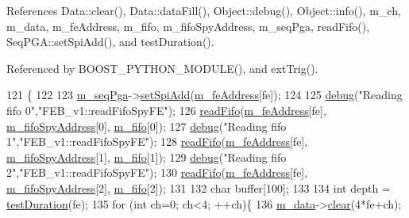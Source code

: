 References Data\+::clear(), Data\+::data\+Fill(), Object\+::debug(), Object\+::info(), m\+\_\+ch, m\+\_\+data, m\+\_\+fe\+Address, m\+\_\+fifo, m\+\_\+fifo\+Spy\+Address, m\+\_\+seq\+Pga, read\+Fifo(), Seq\+P\+G\+A\+::set\+Spi\+Add(), and test\+Duration().



Referenced by B\+O\+O\+S\+T\+\_\+\+P\+Y\+T\+H\+O\+N\+\_\+\+M\+O\+D\+U\+L\+E(), and ext\+Trig().


\begin{DoxyCode}
121                                              \{
122    
123   \hyperlink{classFEB__v1_a6c7804ac86796f233a8393043adf2e77}{m\_seqPga}->\hyperlink{classSeqPGA_ac998ce3a6d9b5f2e88cc8393f8c1df53}{setSpiAdd}(\hyperlink{classFEB__v1_a4e1945c2d5b434125f375e9d0fc6d99f}{m\_feAddress}[fe]);
124 
125   \hyperlink{classObject_aac010553f022165573714b7014a15f0d}{debug}(\textcolor{stringliteral}{"Reading fifo 0"},\textcolor{stringliteral}{"FEB\_v1::readFifoSpyFE"});
126   \hyperlink{classFEB__v1_af945f99a912c5ad076ebdb03dbb6c139}{readFifo}(\hyperlink{classFEB__v1_a4e1945c2d5b434125f375e9d0fc6d99f}{m\_feAddress}[fe], \hyperlink{classFEB__v1_a15b48648ba4534e732376b68bddc5d34}{m\_fifoSpyAddress}[0], 
      \hyperlink{classFEB__v1_ae5b770f2f5ffb97324862c93e3153985}{m\_fifo}[0]);
127   \hyperlink{classObject_aac010553f022165573714b7014a15f0d}{debug}(\textcolor{stringliteral}{"Reading fifo 1"},\textcolor{stringliteral}{"FEB\_v1::readFifoSpyFE"});
128   \hyperlink{classFEB__v1_af945f99a912c5ad076ebdb03dbb6c139}{readFifo}(\hyperlink{classFEB__v1_a4e1945c2d5b434125f375e9d0fc6d99f}{m\_feAddress}[fe], \hyperlink{classFEB__v1_a15b48648ba4534e732376b68bddc5d34}{m\_fifoSpyAddress}[1], 
      \hyperlink{classFEB__v1_ae5b770f2f5ffb97324862c93e3153985}{m\_fifo}[1]);
129   \hyperlink{classObject_aac010553f022165573714b7014a15f0d}{debug}(\textcolor{stringliteral}{"Reading fifo 2"},\textcolor{stringliteral}{"FEB\_v1::readFifoSpyFE"});
130   \hyperlink{classFEB__v1_af945f99a912c5ad076ebdb03dbb6c139}{readFifo}(\hyperlink{classFEB__v1_a4e1945c2d5b434125f375e9d0fc6d99f}{m\_feAddress}[fe], \hyperlink{classFEB__v1_a15b48648ba4534e732376b68bddc5d34}{m\_fifoSpyAddress}[2], 
      \hyperlink{classFEB__v1_ae5b770f2f5ffb97324862c93e3153985}{m\_fifo}[2]);
131   
132   \textcolor{keywordtype}{char} buffer[100];
133   
134   \textcolor{keywordtype}{int} depth = \hyperlink{classFEB__v1_a7f1db8ca9490172fce7603da9e703dec}{testDuration}(fe);
135   \textcolor{keywordflow}{for} (\textcolor{keywordtype}{int} ch=0; ch<4; ++ch)\{
136     \hyperlink{classFEB__v1_a1c9dbc3660021dba1f58666d0097abb0}{m\_data}->\hyperlink{classData_acdda95480997a3d6245799810334739d}{clear}(4*fe+ch);

\end{DoxyCode}
